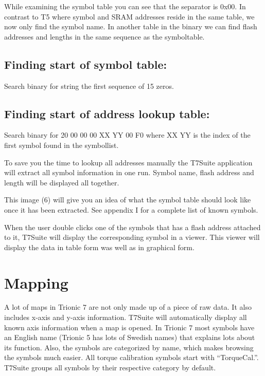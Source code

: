 \documentclass[11pt,a4paper]{book}
\begin{document}
While examining the symbol table you can see that the separator is 0x00. In contrast to T5 where
symbol and SRAM addresses reside in the same table, we now only find the symbol name. In another
table in the binary we can find flash addresses and lengths in the same sequence as the symboltable.

\section{Finding start of symbol table:}

Search binary for string the first sequence of 15 zeros.
\section{Finding start of address lookup table:}
Search binary for 20 00 00 00 XX YY 00 F0 where XX YY is the index of the first
symbol found in the symbollist.

To save you the time to lookup all addresses manually the T7Suite application
will extract all symbol information in one run. Symbol name, flash address and
length will be displayed all together.

This image (6) will give you an idea of what the symbol table should look like once it has been
extracted. See appendix I for a complete list of known symbols.
\begin{figure}[]
    \centering
    \missingfigure{}
    \caption{}
    \label{fig:}
\end{figure}

When the user double clicks one of the symbols that has a flash address attached
to it, T7Suite will display the corresponding symbol in a viewer. This viewer
will display the data in table form was well as in graphical form.
\begin{figure}[]
    \centering
    \missingfigure{}
    \caption{}
    \label{fig:}
\end{figure}

\chapter{Mapping}
A lot of maps in Trionic 7 are not only made up of a piece of raw data. It also
includes x-axis and y-axis information. T7Suite will automatically display all
known axis information when a map is opened. In Trionic 7 most symbols have an
English name (Trionic 5 has lots of Swedish names) that explains lots about its
function. Also, the symbols are categorized by name, which makes browsing the
symbols much easier. All torque calibration symbols start with
\enquote{TorqueCal.}. T7Suite groups all symbols by their respective category by
default.
\end{document}
